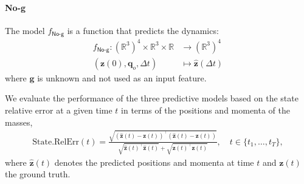 \documentclass[preprint]{article} %
\begin{document}
\paragraph{No-g} The model $f_{\textsf{No-g}}$ is a function that predicts the dynamics: 
\begin{equation}
\begin{aligned}
    f_{\textsf{No-g}}: (\mathbb R^3)^4 \times \mathbb{R}^3 \times \mathbb R &\to (\mathbb R^{3})^4  \\
    (\mathbf{z}(0),\mathbf{q}_o, \Delta t) &\mapsto  \mathbf{\hat z}(\Delta t)
\end{aligned}\label{eq:goal_F_no-g}
\end{equation}
where $\mathbf{g}$ is unknown and not used as an input feature.

We evaluate the performance of the three predictive models based on the state relative error at a given time $t$ in terms of the positions and momenta of the masses,
\begin{align}
    \text{State.RelErr}(t) =  \frac{\sqrt{(\hat{\mathbf{z}}(t)-\mathbf{z}(t))^\top (\hat{\mathbf{z}}(t)-\mathbf{z}(t))}}{\sqrt{\hat{\mathbf z}(t)^\top\hat{\mathbf z}(t)}+\sqrt{\mathbf z(t)^\top \mathbf z(t)}}, \quad t\in\{t_1,\ldots,t_T\},\label{eq:state_relerr}
\end{align}
where $\hat{\mathbf{z}}(t)$ denotes the predicted positions and momenta at time $t$ and $\mathbf{z}(t)$ the ground truth.
\end{document}
